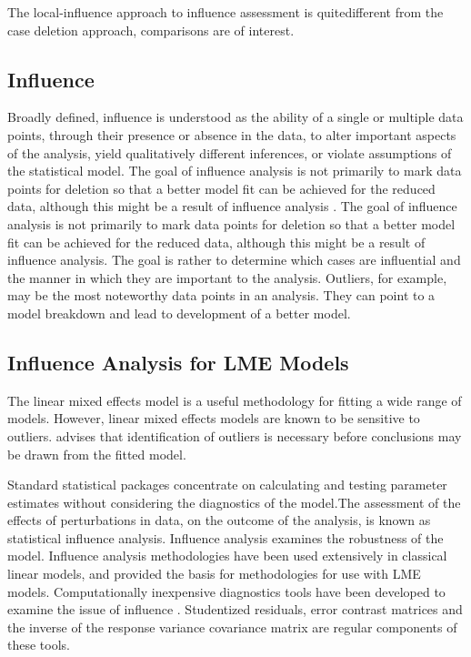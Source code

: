 \documentclass[12pt, a4paper]{article}
\begin{document}
The local-influence approach to influence assessment is quitedifferent from the case deletion approach, comparisons are of
interest.

	\subsection{Influence}
	
	
	Broadly defined, influence is understood as the ability of a single or multiple data points, through their presence or absence in the data, to alter important aspects of the analysis, yield qualitatively different inferences, or violate assumptions of the statistical model. The goal of influence analysis is not primarily to mark data
	points for deletion so that a better model fit can be achieved for the reduced data, although this might be a result of influence analysis \citep{schabenberger}.			
	The goal of influence analysis is not primarily to mark data
	points for deletion so that a better model fit can be achieved for the reduced data, although this might be a
	result of influence analysis. The goal is rather to determine which cases are influential and the manner in
	which they are important to the analysis. Outliers, for example, may be the most noteworthy data points in
	an analysis. They can point to a model breakdown and lead to development of a better model.

	\subsection{Influence Analysis for LME Models} %
			The linear mixed effects model is a useful methodology for fitting a wide range of models. However, linear mixed effects models are known to be sensitive to outliers. \citet{CPJ} advises that identification of outliers is necessary before conclusions may be drawn from the fitted model.
			
			Standard statistical packages concentrate on calculating and testing parameter estimates without considering the diagnostics of the model.The assessment of the effects of perturbations in data, on the outcome of the analysis, is known as statistical influence analysis. Influence analysis examines the robustness of the model. Influence analysis methodologies have been used extensively in classical linear models, and provided the basis for methodologies for use with LME models.
			Computationally inexpensive diagnostics tools have been developed to examine the issue of influence \citep{Zewotir}.
			Studentized residuals, error contrast matrices and the inverse of the response variance covariance matrix are regular components of these tools.
			
\end{document}
